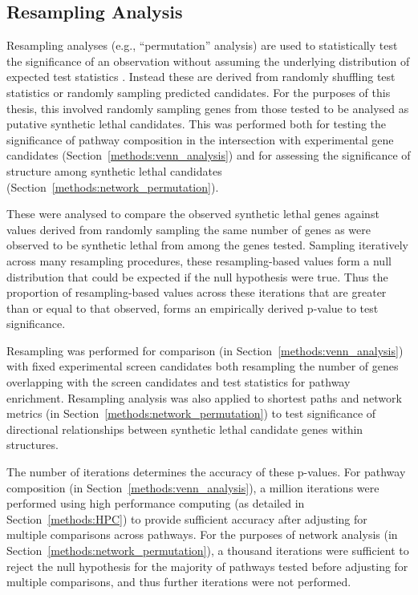 \subsection{Resampling Analysis} \label{methods:permutation}
Resampling analyses (e.g., ``permutation'' analysis) are used to statistically test the significance of an observation without assuming the underlying distribution of expected test statistics \citep{Collingridge2013}. Instead these are derived from randomly shuffling test statistics or randomly sampling predicted candidates. For the purposes of this thesis, this involved randomly sampling genes from those tested to be analysed as putative \gls{synthetic lethal} candidates. This was performed both for testing the significance of \gls{pathway} composition in the intersection with experimental gene candidates (Section~\ref{methods:venn_analysis}) and for assessing the significance of  structure among \gls{synthetic lethal} candidates (Section~\ref{methods:network_permutation}).

These were analysed to compare the observed \gls{synthetic lethal} genes against values derived from randomly sampling the same number of genes as were observed to be \gls{synthetic lethal} from among the genes tested. Sampling iteratively across many resampling procedures, these resampling-based values form a null distribution that could be expected if the null hypothesis were true. Thus the proportion of resampling-based values across these iterations that are greater than or equal to that observed, forms an empirically derived p-value to test significance.

Resampling was performed for comparison (in Section~\ref{methods:venn_analysis}) with fixed experimental screen candidates \citep{Telford2015} both resampling the number of genes overlapping with the screen candidates and test statistics for \gls{pathway} enrichment. Resampling analysis was also applied to \glspl{shortest path} and network metrics (in Section~\ref{methods:network_permutation}) to test significance of directional relationships between \gls{synthetic lethal} candidate genes within  structures.

The number of iterations determines the accuracy of these p-values. For \gls{pathway} composition (in Section~\ref{methods:venn_analysis}), a million iterations were performed using high performance computing (as detailed in Section~\ref{methods:HPC}) to provide sufficient accuracy after adjusting for multiple comparisons across \glspl{pathway}. For the purposes of network analysis (in Section~\ref{methods:network_permutation}), a thousand iterations were sufficient to reject the null hypothesis for the majority of \glspl{pathway} tested before adjusting for multiple comparisons, and thus further iterations were not performed.

